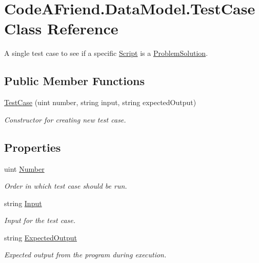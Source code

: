 \hypertarget{class_code_a_friend_1_1_data_model_1_1_test_case}{}\section{Code\+A\+Friend.\+Data\+Model.\+Test\+Case Class Reference}
\label{class_code_a_friend_1_1_data_model_1_1_test_case}


A single test case to see if a specific \mbox{\hyperlink{class_code_a_friend_1_1_data_model_1_1_script}{Script}} is a \mbox{\hyperlink{class_code_a_friend_1_1_data_model_1_1_problem_solution}{Problem\+Solution}}.  


\subsection*{Public Member Functions}
\begin{DoxyCompactItemize}
\item 
\mbox{\hyperlink{class_code_a_friend_1_1_data_model_1_1_test_case_a519cc6b3bdbaff066a058e08fee96a96}{Test\+Case}} (uint number, string input, string expected\+Output)
\begin{DoxyCompactList}\small\item\em Constructor for creating new test case.\end{DoxyCompactList}\end{DoxyCompactItemize}
\subsection*{Properties}
\begin{DoxyCompactItemize}
\item 
uint \mbox{\hyperlink{class_code_a_friend_1_1_data_model_1_1_test_case_a863e62751e85efd8d074eeb1ab4404e3}{Number}}
\begin{DoxyCompactList}\small\item\em Order in which test case should be run.\end{DoxyCompactList}\item 
string \mbox{\hyperlink{class_code_a_friend_1_1_data_model_1_1_test_case_adb2e92070940ad2783a54837beccfa9c}{Input}}
\begin{DoxyCompactList}\small\item\em Input for the test case.\end{DoxyCompactList}\item 
string \mbox{\hyperlink{class_code_a_friend_1_1_data_model_1_1_test_case_a9da9aa35282aa7c6fab6fe266ba414fc}{Expected\+Output}}
\begin{DoxyCompactList}\small\item\em Expected output from the program during execution.\end{DoxyCompactList}\end{DoxyCompactItemize}


